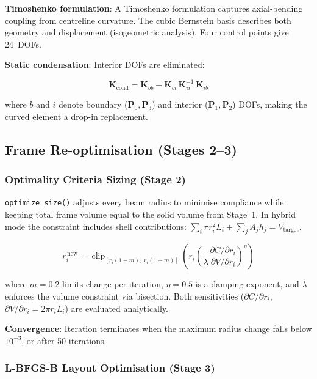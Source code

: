 \documentclass[a4paper, 11pt, openany]{report}
\begin{document}
\textbf{Timoshenko formulation}: A Timoshenko formulation captures
axial-bending coupling from centreline curvature.  The cubic Bernstein basis
describes both geometry and displacement (isogeometric analysis).  Four control
points give 24~DOFs.

\textbf{Static condensation}: Interior DOFs are eliminated:

\begin{equation}
\label{eq:condensation}
\mathbf{K}_{\text{cond}} = \mathbf{K}_{bb}
- \mathbf{K}_{bi}\,\mathbf{K}_{ii}^{-1}\,\mathbf{K}_{ib}
\end{equation}

where $b$ and $i$ denote boundary ($\mathbf{P}_0, \mathbf{P}_3$) and interior
($\mathbf{P}_1, \mathbf{P}_2$) DOFs, making the curved element a drop-in
replacement.


\subsection{Frame Re-optimisation (Stages 2--3)}
\label{sec:alg-reopt}

\subsubsection{Optimality Criteria Sizing (Stage 2)}

\texttt{optimize\_size()} adjusts every beam radius to minimise compliance while
keeping total frame volume equal to the solid volume from Stage~1.  In hybrid
mode the constraint includes shell contributions:
$\sum_i \pi r_i^2 L_i + \sum_j A_j h_j = V_{\text{target}}$.

\begin{equation}
\label{eq:oc-size}
r_i^{\,\text{new}} = \operatorname{clip}_{[r_i(1-m),\; r_i(1+m)]}
\left( r_i \left( \frac{-\partial C / \partial r_i}
{\lambda\;\partial V / \partial r_i} \right)^{\!\eta} \right)
\end{equation}

where $m = 0.2$ limits change per iteration, $\eta = 0.5$ is a damping
exponent, and $\lambda$ enforces the volume constraint via bisection.  Both
sensitivities ($\partial C/\partial r_i$,
$\partial V/\partial r_i = 2\pi r_i L_i$) are evaluated analytically.

\textbf{Convergence}: Iteration terminates when the maximum radius change falls
below $10^{-3}$, or after 50 iterations.


\subsubsection{L-BFGS-B Layout Optimisation (Stage 3)}
\end{document}
